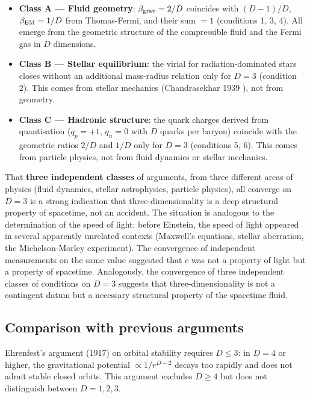 \documentclass[10pt,a4paper]{article}
\begin{document}
\begin{itemize}
\item \textbf{Class A --- Fluid geometry}: $\beta_{\rm grav} = 2/D$ coincides with $(D-1)/D$, $\beta_{\rm EM} = 1/D$ from Thomas-Fermi, and their sum $= 1$ (conditions 1, 3, 4). All emerge from the geometric structure of the compressible fluid and the Fermi gas in $D$ dimensions.

\item \textbf{Class B --- Stellar equilibrium}: the virial for radiation-dominated stars closes without an additional mass-radius relation only for $D = 3$ (condition 2). This comes from stellar mechanics (Chandrasekhar 1939 \cite{Chandrasekhar1939}), not from geometry.

\item \textbf{Class C --- Hadronic structure}: the quark charges derived from quantisation ($q_p = +1$, $q_n = 0$ with $D$ quarks per baryon) coincide with the geometric ratios $2/D$ and $1/D$ only for $D = 3$ (conditions 5, 6). This comes from particle physics, not from fluid dynamics or stellar mechanics.
\end{itemize}

That \textbf{three independent classes} of arguments, from three different areas of physics (fluid dynamics, stellar astrophysics, particle physics), all converge on $D = 3$ is a strong indication that three-dimensionality is a deep structural property of spacetime, not an accident. The situation is analogous to the determination of the speed of light: before Einstein, the speed of light appeared in several apparently unrelated contexts (Maxwell's equations, stellar aberration, the Michelson-Morley experiment). The convergence of independent measurements on the same value suggested that $c$ was not a property of light but a property of spacetime. Analogously, the convergence of three independent classes of conditions on $D = 3$ suggests that three-dimensionality is not a contingent datum but a necessary structural property of the spacetime fluid.

\subsection{Comparison with previous arguments}

Ehrenfest's argument (1917) on orbital stability requires $D \leq 3$: in $D = 4$ or higher, the gravitational potential $\propto 1/r^{D-2}$ decays too rapidly and does not admit stable closed orbits. This argument excludes $D \geq 4$ but does not distinguish between $D = 1, 2, 3$.
\end{document}
